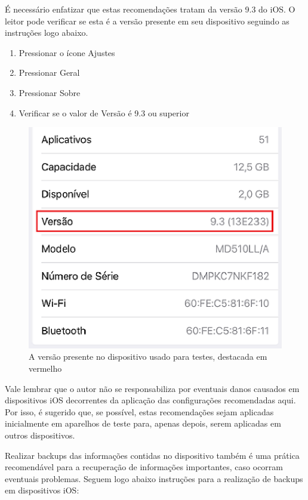 \'E necess\'ario enfatizar que estas recomenda\c c\~oes tratam da vers\~ao 9.3 do iOS. O leitor pode verificar se esta \'e a vers\~ao presente em seu dispositivo seguindo as instru\c c\~oes logo abaixo.

\begin{enumerate}
\item Pressionar o \'icone Ajustes
\item Pressionar Geral
\item Pressionar Sobre
\item Verificar se o valor de Vers\~ao \'e 9.3 ou superior
\end{enumerate}

\begin{figure}[h]
  \centering
  \includegraphics{imagem2.eps}
  \caption{A vers\~ao presente no dispositivo usado para testes, destacada em vermelho}
\end{figure}

Vale lembrar que o autor n\~ao se responsabiliza por eventuais danos causados em dispositivos iOS decorrentes da aplica\c c\~ao das configura\c c\~oes recomendadas aqui. Por isso, \'e sugerido que, se poss\'ivel, estas recomenda\c c\~oes sejam aplicadas inicialmente em aparelhos de teste para, apenas depois, serem aplicadas em outros dispositivos. 

Realizar backups das informa\c c\~oes contidas no dispositivo tamb\'em \'e uma pr\'atica recomend\'avel para a recupera\c c\~ao de informa\c c\~oes importantes, caso ocorram eventuais problemas. Seguem logo abaixo instru\c c\~oes para a realiza\c c\~ao de backups em dispositivos iOS:

